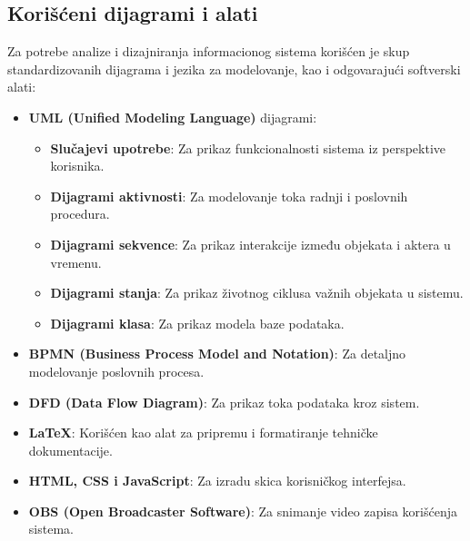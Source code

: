 \subsection{Korišćeni dijagrami i alati}
Za potrebe analize i dizajniranja informacionog sistema korišćen je skup standardizovanih dijagrama i jezika za modelovanje, kao i odgovarajući softverski alati:

\begin{itemize}
    \item \textbf{UML (Unified Modeling Language)} dijagrami:
    \begin{itemize}
        \item \textbf{Slučajevi upotrebe}: Za prikaz funkcionalnosti sistema iz perspektive korisnika.
        \item \textbf{Dijagrami aktivnosti}: Za modelovanje toka radnji i poslovnih procedura.
        \item \textbf{Dijagrami sekvence}: Za prikaz interakcije između objekata i aktera u vremenu.
        \item \textbf{Dijagrami stanja}: Za prikaz životnog ciklusa važnih objekata u sistemu.
        \item \textbf{Dijagrami klasa}: Za prikaz modela baze podataka.
    \end{itemize}
    \item \textbf{BPMN (Business Process Model and Notation)}: Za detaljno modelovanje poslovnih procesa.
    \item \textbf{DFD (Data Flow Diagram)}: Za prikaz toka podataka kroz sistem.
    \item \textbf{LaTeX}: Korišćen kao alat za pripremu i formatiranje tehničke dokumentacije.
    \item \textbf{HTML, CSS i JavaScript}: Za izradu skica korisničkog interfejsa.
    \item \textbf{OBS (Open Broadcaster Software)}: Za snimanje video zapisa korišćenja sistema.
\end{itemize}